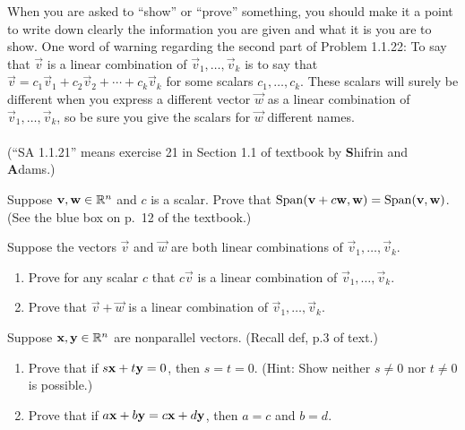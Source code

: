 When you are asked to ``show'' or ``prove'' something, you should make it a point to
write down clearly the information you are given and what it is you are to show. One
word of warning regarding the second part of Problem  1.1.22: 
To say that $\vec{v}$ is a linear combination of $\vec{v}_1, \dots, \vec{v}_k$
is to say that 
$\vec{v} = c_1\vec{v}_1 + c_2\vec{v}_2 +\cdots + c_k\vec{v}_k$ for some scalars 
$c_1,\dots, c_k$. These scalars
will surely be different when you express a different vector $\vec{w}$ 
as a linear combination of $\vec{v}_1, \dots, \vec{v}_k$, so be sure you give
the scalars for $\vec{w}$ different names. \\
\\
(``SA 1.1.21'' means exercise 21 in Section 1.1 of textbook by 
{\bf S}hifrin and {\bf A}dams.)\\[4pt]

\begin{problem}[SA 1.1.21]
Suppose $\mathbf{v}, \mathbf{w} \in \mathbb{R}^n$ and $c$ is a scalar. Prove that 
$\operatorname{Span} (\mathbf{v} + c\mathbf{w},\mathbf{w}) = \operatorname{Span} (\mathbf{v},\mathbf{w})$. (See the blue box on p.~12 of the textbook.)
\end{problem}

\newpage

\begin{problem}[SA 1.1.22]
Suppose the vectors $\vec{v}$ and $\vec{w}$ are both linear combinations of 
$\vec{v}_1, \dots, \vec{v}_k$.
\begin{enumerate}
\item 
Prove for any scalar $c$ that $c\vec{v}$ is a linear combination of 
$\vec{v}_1,\dots, \vec{v}_k$.
\item
Prove that $\vec{v} + \vec{w}$ is a linear combination of 
$\vec{v}_1,\dots,\vec{v}_k$.
\end{enumerate}

\end{problem}

\newpage


\begin{problem}[SA 1.1.25]
Suppose $\mathbf{x}, \mathbf{y} \in \mathbb{R}^n$ are nonparallel vectors. (Recall def, p.3 of text.)
\begin{enumerate}
\item 
Prove that if $s\mathbf{x} + t\mathbf{y} = 0$, then $s = t = 0$. 
(Hint: Show neither $s \neq 0$ nor $t \neq0$ is possible.)
\item Prove that if $a\mathbf{x} + b\mathbf{y} = c\mathbf{x} + d\mathbf{y}$, then $a = c$ and $b = d$.
\end{enumerate}
\end{problem}


